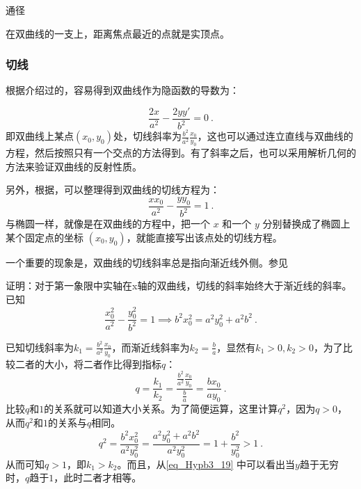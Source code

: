 通径

在双曲线的一支上，距离焦点最近的点就是实顶点。

\subsubsection{切线}

根据介绍过的，容易得到双曲线作为隐函数的导数为：

\begin{equation}
\frac{2x}{a^2} - \frac{2yy'}{b^2} = 0~.
\end{equation}
即双曲线上某点$(x_0,y_0)$处，切线斜率为$\displaystyle\frac{b^2}{a^2}\frac{x_0}{y_0}$，这也可以通过连立直线与双曲线的方程，然后按照只有一个交点的方法得到。有了斜率之后，也可以采用解析几何的方法来验证双曲线的反射性质。

另外，根据，可以整理得到双曲线的切线方程为：
\begin{equation}
\frac{xx_0}{a^2} - \frac{yy_0}{b^2} = 1~.
\end{equation}
与椭圆一样，就像是在双曲线的方程中，把一个 $x$ 和一个 $y$ 分别替换成了椭圆上某个固定点的坐标 $(x_0, y_0)$，就能直接写出该点处的切线方程。

一个重要的现象是，双曲线的切线斜率总是指向渐近线外侧。参见
\begin{example}{证明：对于第一象限中实轴在x轴的双曲线，切线的斜率始终大于渐近线的斜率。}
已知
\begin{equation}
\frac{x_0^2}{a^2} - \frac{y_0^2}{b^2} = 1\implies b^2x_0^2=a^2y_0^2+a^2b^2~.
\end{equation}

已知切线斜率为$k_1=\displaystyle\frac{b^2}{a^2}\frac{x_0}{y_0}$，而渐近线斜率为$k_2=\displaystyle\frac{b}{a}$，显然有$k_1>0,k_2>0$，为了比较二者的大小，将二者作比得到指标$q$：
\begin{equation}
q=\frac{k_1}{k_2}
=\frac{\displaystyle\frac{b^2}{a^2}\frac{x_0}{y_0}}{\displaystyle\frac{b}{a}}
=\frac{bx_0}{ay_0}~.
\end{equation}
比较$q$和$1$的关系就可以知道大小关系。为了简便运算，这里计算$q^2$，因为$q>0$，从而$q^2$和$1$的关系与$q$相同。
\begin{equation}\label{eq_Hypb3_19}
q^2=\frac{b^2x_0^2}{a^2y_0^2}=\frac{a^2y_0^2+a^2b^2}{a^2y_0^2}=1+\frac{b^2}{y_0^2}>1~.
\end{equation}
从而可知$q>1$，即$k_1>k_2$。而且，从\autoref{eq_Hypb3_19} 中可以看出当$y$趋于无穷时，$q$趋于$1$，此时二者才相等。
\end{example}

